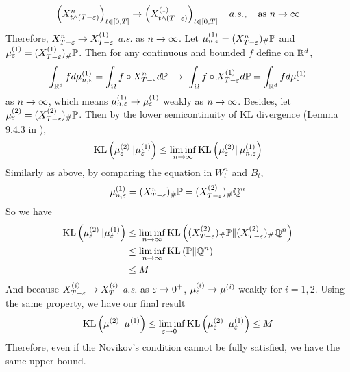 \documentclass[a4paper,12pt]{article}
\begin{document}
\begin{enumerate}[label=(\arabic*)]
\begin{rmk}
    \begin{equation*}
      \left(X^n_{t \wedge (T-\varepsilon)}\right)_{t \in [0,T]} \rightarrow  \left(X_{t \wedge (T-\varepsilon)}^{(1)}\right)_{t \in [0,T]}\quad a.s.,\quad \text{as } n \rightarrow \infty
    \end{equation*}
    Therefore, $X^n_{T-\varepsilon} \rightarrow X^{(1)}_{T-\varepsilon}$ \emph{a.s.} as $n \rightarrow \infty$. Let $\mu^{(1)}_{n,\varepsilon} = (X^n_{T-\varepsilon})_{\#}\mathbb{P}$ and $\mu^{(1)}_{\varepsilon} = (X^{(1)}_{T-\varepsilon})_{\#}\mathbb{P}$. Then for any continuous and bounded $f$ define on $\mathbb{R}^d$,
    \begin{equation*}
      \int_{\mathbb{R}^d} f d\mu^{(1)}_{n,\varepsilon} = \int_{\Omega} f\circ X^n_{T-\varepsilon}  d\mathbb{P} ~\rightarrow~  \int_{\Omega} f\circ X^{(1)}_{T-\varepsilon} d\mathbb{P} = \int_{\mathbb{R}^d} f d\mu^{(1)}_{\varepsilon}
    \end{equation*}
    as $n \rightarrow \infty$, which means $\mu^{(1)}_{n,\varepsilon} \rightarrow \mu^{(1)}_{\varepsilon}$ weakly as $n \rightarrow \infty$. Besides, let $\mu_{\varepsilon}^{(2)} = (X^{(2)}_{T-\varepsilon})_{\#}\mathbb{P}$. Then by the lower semicontinuity of KL divergence (Lemma 9.4.3 in \cite{ambrosio2008gradient}),
    \begin{equation*}
      \operatorname{KL}\left(\mu_{\varepsilon}^{(2)} \Vert \mu^{(1)}_{\varepsilon}\right) \leq \liminf_{n\rightarrow \infty} \operatorname{KL}\left(\mu_{\varepsilon}^{(2)} \Vert \mu^{(1)}_{n,\varepsilon}\right) 
    \end{equation*}
    Similarly as above, by comparing the equation in $W^n_t$ and $B_t$,
    \begin{equation*}
      \mu^{(1)}_{n,\varepsilon} = (X^n_{T-\varepsilon})_{\#}\mathbb{P} = (X^{(2)}_{T-\varepsilon})_{\#}\mathbb{Q}^n
    \end{equation*}
    So we have
    \begin{equation*}
      \begin{aligned}
        \operatorname{KL}\left(\mu_{\varepsilon}^{(2)} \Vert \mu^{(1)}_{\varepsilon}\right) &\leq \liminf_{n\rightarrow \infty} \operatorname{KL}\left((X^{(2)}_{T-\varepsilon})_{\#}\mathbb{P} \Vert (X^{(2)}_{T-\varepsilon})_{\#}\mathbb{Q}^n\right) \\
        &\leq \liminf_{n\rightarrow \infty} \operatorname{KL}\left(\mathbb{P} \Vert \mathbb{Q}^n\right) \\
        &\leq M
      \end{aligned}
    \end{equation*}
    And because $X^{(i)}_{T-\varepsilon} \rightarrow X^{(i)}_{T}$ \emph{a.s.} as $\varepsilon \rightarrow 0^+$, $\mu_{\varepsilon}^{(i)} \rightarrow \mu^{(i)}$ weakly for $i = 1,2$. Using the same property, we have our final result
    \begin{equation*}
      \operatorname{KL}\left(\mu^{(2)} \Vert \mu^{(1)}\right) \leq \liminf_{\varepsilon \rightarrow 0^+}\operatorname{KL}\left(\mu_{\varepsilon}^{(2)} \Vert \mu^{(1)}_{\varepsilon}\right) \leq M
    \end{equation*}
    Therefore, even if the Novikov’s condition cannot be fully satisfied, we have the same upper bound.
  \end{rmk}


\end{enumerate}
\end{document}
